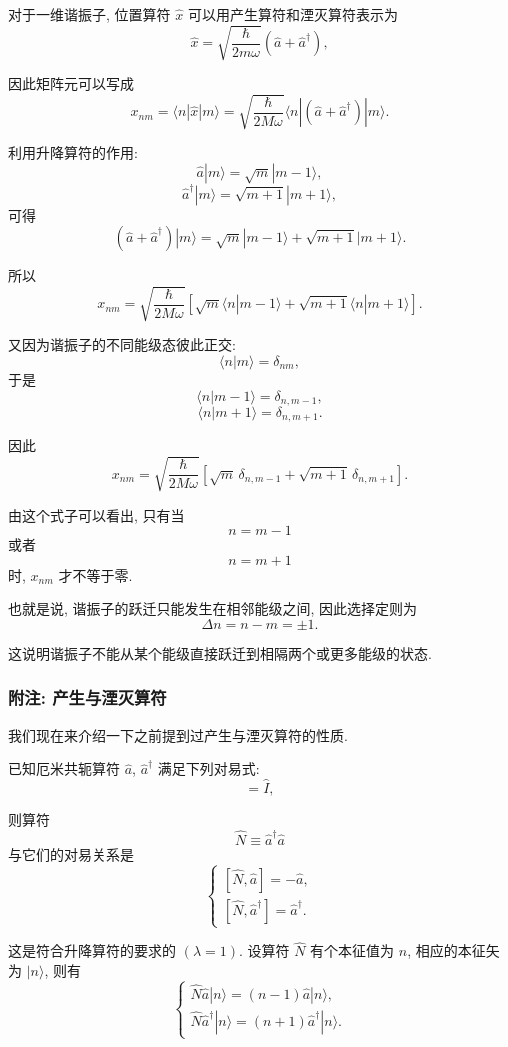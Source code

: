 对于一维谐振子, 位置算符 $\hat{x}$ 可以用产生算符和湮灭算符表示为
\[
\hat{x}
=
\sqrt{\frac{\hbar}{2m\omega}}
\left(
\hat{a}+\hat{a}^{\dagger}
\right),
\]

因此矩阵元可以写成
\[
x_{nm}
=
\langle n|\hat{x}|m\rangle
=
\sqrt{\frac{\hbar}{2M\omega}}
\langle n|
\left(
\hat{a}+\hat{a}^{\dagger}
\right)
|m\rangle.
\]

利用升降算符的作用:
\[
\hat{a}|m\rangle=\sqrt{m}|m-1\rangle,
\]
\[
\hat{a}^{\dagger}|m\rangle=\sqrt{m+1}|m+1\rangle,
\]
可得
\[
\left(
\hat{a}+\hat{a}^{\dagger}
\right)|m\rangle
=
\sqrt{m}|m-1\rangle
+
\sqrt{m+1}|m+1\rangle.
\]

所以
\[
x_{nm}
=
\sqrt{\frac{\hbar}{2M\omega}}
\left[
\sqrt{m}\langle n|m-1\rangle
+
\sqrt{m+1}\langle n|m+1\rangle
\right].
\]

又因为谐振子的不同能级态彼此正交:
\[
\langle n|m\rangle=\delta_{nm},
\]
于是
\[
\langle n|m-1\rangle=\delta_{n, m-1},
\]
\[
\langle n|m+1\rangle=\delta_{n, m+1}.
\]

因此
\[
x_{nm}
=
\sqrt{\frac{\hbar}{2M\omega}}
\left[
\sqrt{m}\, \delta_{n, m-1}
+
\sqrt{m+1}\, \delta_{n, m+1}
\right].
\]

由这个式子可以看出, 只有当
\[
n=m-1
\]
或者
\[
n=m+1
\]
时, $x_{nm}$ 才不等于零.

也就是说, 谐振子的跃迁只能发生在相邻能级之间, 因此选择定则为
\[
\Delta n=n-m=\pm 1.
\]

这说明谐振子不能从某个能级直接跃迁到相隔两个或更多能级的状态.

\subsubsection{附注: 产生与湮灭算符}
我们现在来介绍一下之前提到过产生与湮灭算符的性质.

已知厄米共轭算符 $\hat{a}$, $\hat{a}^{\dagger}$ 满足下列对易式:
\begin{equation}
[\hat{a}, \hat{a}^{\dagger}]=\hat{I},
\tag{A.95}
\end{equation}

则算符
\[
\hat{N}\equiv \hat{a}^{\dagger}\hat{a}
\]
与它们的对易关系是
\begin{equation}
\begin{cases}
[\hat{N}, \hat{a}]=-\hat{a}, \\
[\hat{N}, \hat{a}^{\dagger}]=\hat{a}^{\dagger}.
\end{cases}
\tag{A.96}
\end{equation}

这是符合升降算符的要求的 $(\lambda=1)$.
设算符 $\hat{N}$ 有个本征值为 $n$, 相应的本征矢为 $|n\rangle$,
则有
\[
\begin{cases}
\hat{N}\hat{a}|n\rangle=(n-1)\hat{a}|n\rangle, \\
\hat{N}\hat{a}^{\dagger}|n\rangle=(n+1)\hat{a}^{\dagger}|n\rangle.
\end{cases}
\]

